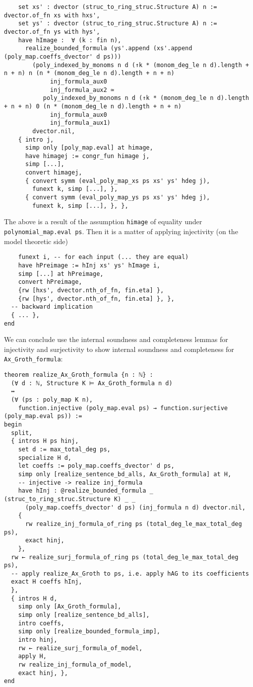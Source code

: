 \begin{lstlisting}
    set xs' : dvector (struc_to_ring_struc.Structure A) n := dvector.of_fn xs with hxs',
    set ys' : dvector (struc_to_ring_struc.Structure A) n := dvector.of_fn ys with hys',
    have hImage :  ∀ (k : fin n),
      realize_bounded_formula (ys'.append (xs'.append (poly_map.coeffs_dvector' d ps)))
        (poly_indexed_by_monoms n d (↑k * (monom_deg_le n d).length + n + n) n (n * (monom_deg_le n d).length + n + n)
             inj_formula_aux0
             inj_formula_aux2 ≃
           poly_indexed_by_monoms n d (↑k * (monom_deg_le n d).length + n + n) 0 (n * (monom_deg_le n d).length + n + n)
             inj_formula_aux0
             inj_formula_aux1)
        dvector.nil,
    { intro j,
      simp only [poly_map.eval] at himage,
      have himagej := congr_fun himage j,
      simp [...],
      convert himagej,
      { convert symm (eval_poly_map_xs ps xs' ys' hdeg j),
        funext k, simp [...], },
      { convert symm (eval_poly_map_ys ps xs' ys' hdeg j),
        funext k, simp [...], }, }, \end{lstlisting}

The above is a result of the assumption \texttt{himage} of equality
under \texttt{polynomial\_map.eval ps}.
Then it is a matter of applying injectivity (on the model theoretic side)

\begin{lstlisting}
    funext i, -- for each input (... they are equal)
    have hPreimage := hInj xs' ys' hImage i,
    simp [...] at hPreimage,
    convert hPreimage,
    {rw [hxs', dvector.nth_of_fn, fin.eta] },
    {rw [hys', dvector.nth_of_fn, fin.eta] }, },
  -- backward implication
  { ... },
end \end{lstlisting}

We can conclude use the internal soundness and completeness lemmas for
injectivity and surjectivity to show internal soundness and completeness
for \texttt{Ax\_Groth\_formula}:

\begin{lstlisting}
theorem realize_Ax_Groth_formula {n : ℕ} :
  (∀ d : ℕ, Structure K ⊨ Ax_Groth_formula n d)
  ↔
  (∀ (ps : poly_map K n),
    function.injective (poly_map.eval ps) → function.surjective (poly_map.eval ps)) :=
begin
  split,
  { intros H ps hinj,
    set d := max_total_deg ps,
    specialize H d,
    let coeffs := poly_map.coeffs_dvector' d ps,
    simp only [realize_sentence_bd_alls, Ax_Groth_formula] at H,
    -- injective -> realize inj_formula
    have hInj : @realize_bounded_formula _ (struc_to_ring_struc.Structure K) _ _
      (poly_map.coeffs_dvector' d ps) (inj_formula n d) dvector.nil,
    {
      rw realize_inj_formula_of_ring ps (total_deg_le_max_total_deg ps),
      exact hinj,
    },
  rw ← realize_surj_formula_of_ring ps (total_deg_le_max_total_deg ps),
  -- apply realize_Ax_Groth to ps, i.e. apply hAG to its coefficients
  exact H coeffs hInj,
  },
  { intros H d,
    simp only [Ax_Groth_formula],
    simp only [realize_sentence_bd_alls],
    intro coeffs,
    simp only [realize_bounded_formula_imp],
    intro hinj,
    rw ← realize_surj_formula_of_model,
    apply H,
    rw realize_inj_formula_of_model,
    exact hinj, },
end
\end{lstlisting} %


